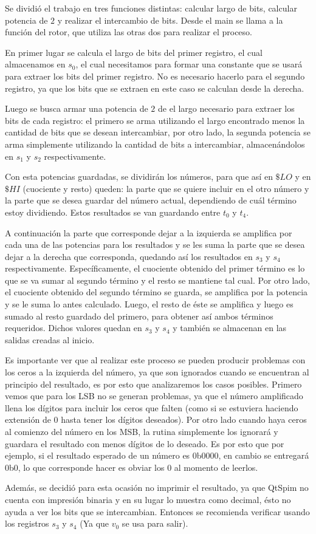 \documentclass[11pt,letterpaper]{article}
\begin{document}
Se dividió el trabajo en tres funciones distintas: calcular largo de bits, calcular potencia de $2$ y realizar el intercambio de bits. Desde el main se llama a la función del rotor, que utiliza las otras dos para realizar el proceso.

En primer lugar se calcula el largo de bits del primer registro, el cual almacenamos en $s_0$, el cual necesitamos para formar una constante que se usará para extraer los bits del primer registro. No es necesario hacerlo para el segundo registro, ya que los bits que se extraen en este caso se calculan desde la derecha.

Luego se busca armar una potencia de $2$ de el largo necesario para extraer los bits de cada registro: el primero se arma utilizando el largo encontrado menos la cantidad de bits que se desean intercambiar, por otro lado, la segunda potencia se arma simplemente utilizando la cantidad de bits a intercambiar, almacenándolos en $s_1$ y $s_2$ respectivamente.

Con esta potencias guardadas, se dividirán los números, para que así en $\$LO$ y en $\$HI$ (cuociente y resto) queden: la parte que se quiere incluir en el otro número y la parte que se desea guardar del número actual, dependiendo de cuál término estoy dividiendo. Estos resultados se van guardando entre $t_0$ y $t_4$.

A continuación la parte que corresponde dejar a la izquierda se amplifica por cada una de las potencias para los resultados y se les suma la parte que se desea dejar a la derecha que corresponda, quedando así los resultados en $s_3$ y $s_4$ respectivamente. Específicamente, el cuociente obtenido del primer término es lo que se va sumar al segundo término y el resto se mantiene tal cual. Por otro lado, el cuociente obtenido del segundo término se guarda, se amplifica por la potencia y se le suma lo antes calculado. Luego, el resto de éste se amplifica y luego es sumado al resto guardado del primero, para obtener así ambos términos requeridos. Dichos valores quedan en $s_3$ y $s_4$ y también se almacenan en las salidas creadas al inicio.

Es importante ver que al realizar este proceso se pueden producir problemas con los ceros a la izquierda del número, ya que son ignorados cuando se encuentran al principio del resultado, es por esto que analizaremos los casos posibles. Primero vemos que para los LSB no se generan problemas, ya que el número amplificado llena los dígitos para incluir los ceros que falten (como si se estuviera haciendo extensión de $0$ hasta tener los dígitos deseados). Por otro lado cuando haya ceros al comienzo del número en los MSB, la rutina simplemente los ignorará y guardara el resultado con menos dígitos de lo deseado. Es por esto que por ejemplo, si el resultado esperado de un número es 0b0000, en cambio se entregará 0b0, lo que corresponde hacer es obviar los $0$ al momento de leerlos.

Además, se decidió para esta ocasión no imprimir el resultado, ya que QtSpim no cuenta con impresión binaria y en su lugar lo muestra como decimal, ésto no ayuda a ver los bits que se intercambian. Entonces se recomienda verificar usando los registros $s_3$ y $s_4$ (Ya que $v_0$ se usa para salir).
\end{document}
